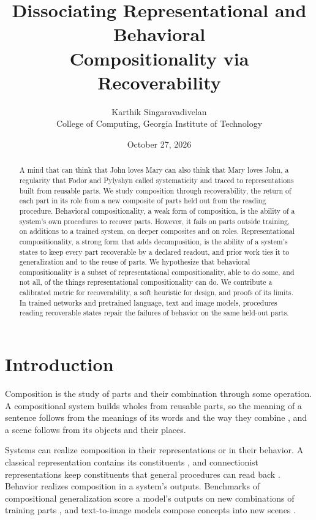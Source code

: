 \documentclass[10pt]{article}
\title{Dissociating Representational and Behavioral\\ Compositionality via Recoverability}
\author{Karthik Singaravadivelan\\ College of Computing, Georgia Institute of Technology}
\date{October 27, 2026}
\theoremstyle{plain}
\theoremstyle{remark}
\begin{document}
\maketitle

\begin{abstract}
A mind that can think that John loves Mary can also think that Mary loves John, a regularity that Fodor and Pylyshyn called systematicity and traced to representations built from reusable parts. We study composition through recoverability, the return of each part in its role from a new composite of parts held out from the reading procedure. Behavioral compositionality, a weak form of composition, is the ability of a system's own procedures to recover parts. However, it fails on parts outside training, on additions to a trained system, on deeper composites and on roles. Representational compositionality, a strong form that adds decomposition, is the ability of a system's states to keep every part recoverable by a declared readout, and prior work ties it to generalization and to the reuse of parts. We hypothesize that behavioral compositionality is a subset of representational compositionality, able to do some, and not all, of the things representational compositionality can do. We contribute a calibrated metric for recoverability, a soft heuristic for design, and proofs of its limits. In trained networks and pretrained language, text and image models, procedures reading recoverable states repair the failures of behavior on the same held-out parts.
\end{abstract}

\section{Introduction}
\label{sec:intro}

Composition is the study of parts and their combination through some operation. A compositional system builds wholes from reusable parts, so the meaning of a sentence follows from the meanings of its words and the way they combine \citep{frege1923,janssen1997}, and a scene follows from its objects and their places.

Systems can realize composition in their representations or in their behavior. A classical representation contains its constituents \citep{fodor1988}, and connectionist representations keep constituents that general procedures can read back \citep{hinton1990,smolensky1990,vangelder1990}. Behavior realizes composition in a system's outputs. Benchmarks of compositional generalization score a model's outputs on new combinations of training parts \citep{lake2018,keysers2020,hupkes2020}, and text-to-image models compose concepts into new scenes \citep{ramesh2021}.
\end{document}
